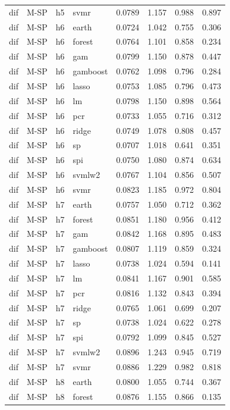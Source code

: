 \begin{ThreePartTable}
\begin{longtable}[t]{llclcccc}
dif & M-SP & h5 & svmr & 0.0789 & 1.157 & 0.988 & 0.897\\
\addlinespace
dif & M-SP & h6 & earth & 0.0724 & 1.042 & 0.755 & 0.306\\
dif & M-SP & h6 & forest & 0.0764 & 1.101 & 0.858 & 0.234\\
dif & M-SP & h6 & gam & 0.0799 & 1.150 & 0.878 & 0.447\\
dif & M-SP & h6 & gamboost & 0.0762 & 1.098 & 0.796 & 0.284\\
dif & M-SP & h6 & lasso & 0.0753 & 1.085 & 0.796 & 0.473\\
dif & M-SP & h6 & lm & 0.0798 & 1.150 & 0.898 & 0.564\\
dif & M-SP & h6 & pcr & 0.0733 & 1.055 & 0.716 & 0.312\\
dif & M-SP & h6 & ridge & 0.0749 & 1.078 & 0.808 & 0.457\\
dif & M-SP & h6 & sp & 0.0707 & 1.018 & 0.641 & 0.351\\
dif & M-SP & h6 & spi & 0.0750 & 1.080 & 0.874 & 0.634\\
dif & M-SP & h6 & svmlw2 & 0.0767 & 1.104 & 0.856 & 0.507\\
dif & M-SP & h6 & svmr & 0.0823 & 1.185 & 0.972 & 0.804\\
\addlinespace
dif & M-SP & h7 & earth & 0.0757 & 1.050 & 0.712 & 0.362\\
dif & M-SP & h7 & forest & 0.0851 & 1.180 & 0.956 & 0.412\\
dif & M-SP & h7 & gam & 0.0842 & 1.168 & 0.895 & 0.483\\
dif & M-SP & h7 & gamboost & 0.0807 & 1.119 & 0.859 & 0.324\\
dif & M-SP & h7 & lasso & 0.0738 & 1.024 & 0.594 & 0.141\\
dif & M-SP & h7 & lm & 0.0841 & 1.167 & 0.901 & 0.585\\
dif & M-SP & h7 & pcr & 0.0816 & 1.132 & 0.843 & 0.394\\
dif & M-SP & h7 & ridge & 0.0765 & 1.061 & 0.699 & 0.207\\
dif & M-SP & h7 & sp & 0.0738 & 1.024 & 0.622 & 0.278\\
dif & M-SP & h7 & spi & 0.0792 & 1.099 & 0.845 & 0.527\\
dif & M-SP & h7 & svmlw2 & 0.0896 & 1.243 & 0.945 & 0.719\\
dif & M-SP & h7 & svmr & 0.0886 & 1.229 & 0.982 & 0.818\\
\addlinespace
dif & M-SP & h8 & earth & 0.0800 & 1.055 & 0.744 & 0.367\\
dif & M-SP & h8 & forest & 0.0876 & 1.155 & 0.866 & 0.135\\

\end{longtable}
\end{ThreePartTable}
